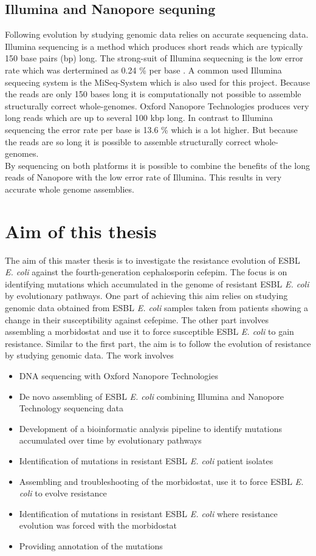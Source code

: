 \subsection{Illumina and Nanopore sequning}
Following evolution by studying genomic data relies on accurate sequencing data. Illumina sequencing is a method which produces short reads which are typically 150 base pairs (bp) long. The strong-suit of Illumina sequecning is the low error rate which was dertermined as 0.24 \% per base \cite{pfeiffer_systematic_2018}. A common used Illumina sequecing system is the MiSeq-System which is also used for this project. Because the reads are only 150 bases long it is computationally not possible to assemble structurally correct whole-genomes. 
Oxford Nanopore Technologies produces very long reads which are up to several 100 kbp long. In contrast to Illumina sequencing the error rate per base is 13.6 \% \cite{noauthor_resolving_nodate} which is a lot higher. But because the reads are so long it is possible to assemble structurally correct whole-genomes. \\
By sequencing on both platforms it is possible to combine the benefits of the long reads of Nanopore with the low error rate of Illumina. This results in very accurate whole genome assemblies.

\section{Aim of this thesis}
The aim of this master thesis is to investigate the resistance evolution of ESBL \textit{E. coli} against the fourth-generation cephalosporin cefepim. The focus is on identifying mutations which accumulated in the genome of resistant ESBL \textit{E. coli} by evolutionary pathways. One part of achieving this aim relies on studying genomic data obtained from ESBL \textit{E. coli} samples taken from patients showing a change in their susceptibility against cefepime. The other part involves assembling a morbidostat and use it to force susceptible ESBL \textit{E. coli} to gain resistance. Similar to the first part, the aim is to follow the evolution of resistance by studying genomic data. The work involves
\begin{itemize}
	\item DNA sequencing with Oxford Nanopore Technologies
	\item De novo assembling of ESBL \textit{E. coli} combining Illumina and Nanopore Technology sequencing data
	\item Development of a bioinformatic analysis pipeline to identify mutations accumulated over time by evolutionary pathways
	\item Identification of mutations in resistant ESBL \textit{E. coli} patient isolates
	\item Assembling and troubleshooting of the morbidostat, use it to force ESBL \textit{E. coli} to evolve resistance
	\item Identification of mutations in resistant ESBL \textit{E. coli} where resistance evolution was forced with the morbidostat
	\item Providing annotation of the mutations
\end{itemize}  